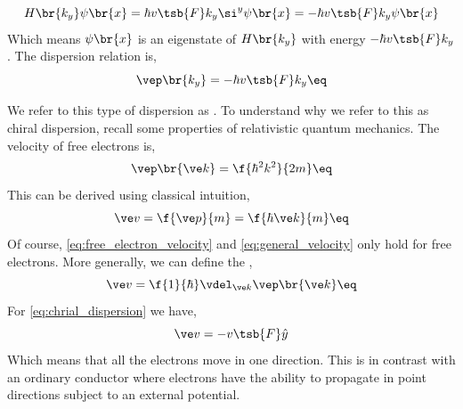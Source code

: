 \documentclass{article}
\begin{document}
\[ H\br{k_y} \psi\br{x} = \hbar v\tsb{F} k_y \si^{y} \psi\br{x} = - \hbar v\tsb{F} k_y \psi\br{x} \]
Which means $\psi\br{x}$ is an eigenstate of $H\br{k_y}$ with energy $- \hbar v\tsb{F} k_y$. The dispersion relation is,
\[ \vep\br{k_y} = - \hbar v\tsb{F} k_y \eq \label{eq:chrial_dispersion}\]
\begin{center}
\end{center}
We refer to this type of dispersion as . To understand why we refer to this as chiral dispersion, recall some properties of relativistic quantum mechanics. The velocity of free electrons is,
\[ \vep\br{\ve k} = \f{\hbar^2 k^2}{2 m} \eq \label{eq:free_electron_velocity}\]
This can be derived using classical intuition,
\[ \ve v = \f{\ve p}{m} = \f{\hbar \ve k}{m} \eq \label{eq:general_velocity}\]
Of course, \cref{eq:free_electron_velocity} and \cref{eq:general_velocity} only hold for free electrons. More generally, we can define the ,
\[ \ve v = \f{1}{\hbar} \vdel_{\ve k} \vep\br{\ve k} \eq \label{eq:group_velocity}\]
For \cref{eq:chrial_dispersion} we have,
\[ \ve v = - v\tsb{F} \hat y \]
Which means that all the electrons move in one direction. This is in contrast with an ordinary conductor where electrons have the ability to propagate in point directions subject to an external potential.\\
\end{document}

